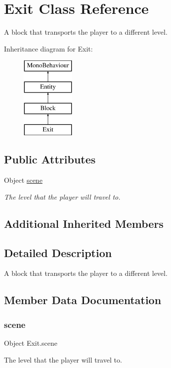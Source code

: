 \hypertarget{class_exit}{}\section{Exit Class Reference}
\label{class_exit}


A block that transports the player to a different level.  


Inheritance diagram for Exit\+:\begin{figure}[H]
\begin{center}
\leavevmode
\includegraphics[height=4.000000cm]{class_exit}
\end{center}
\end{figure}
\subsection*{Public Attributes}
\begin{DoxyCompactItemize}
\item 
Object \mbox{\hyperlink{class_exit_a56bf62271797ae92bdfb6db826149f9c}{scene}}
\begin{DoxyCompactList}\small\item\em The level that the player will travel to. \end{DoxyCompactList}\end{DoxyCompactItemize}
\subsection*{Additional Inherited Members}


\subsection{Detailed Description}
A block that transports the player to a different level. 



\subsection{Member Data Documentation}
\mbox{\label{class_exit_a56bf62271797ae92bdfb6db826149f9c}} 
\subsubsection{\texorpdfstring{scene}{scene}}
{\footnotesize\ttfamily Object Exit.\+scene}



The level that the player will travel to. 

